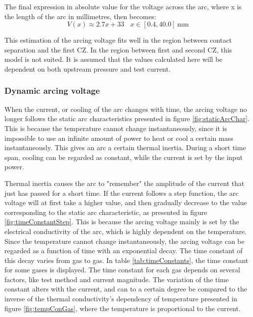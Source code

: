 \documentclass[10pt,b5paper,twoside]{article}
\begin{document}
The final expression in absolute value for the voltage across the arc, where x is the length of the arc in millimetres, then becomes:
\begin{equation}
V(x) \approx 2.7x+33 \ \ \ \ x \in [0.4, 40.0] \ \mathrm{mm}
\end{equation}

This estimation of the arcing voltage fits well in the region between contact separation and the first CZ. In the region between first and second CZ, this model is not suited. It is assumed that the values calculated here will be dependent on both upstream pressure and test current.


\subsubsection{Dynamic arcing voltage} \label{sec:dynARC}
When the current, or cooling of the arc changes with time, the arcing voltage no longer follows the static arc characteristics presented in figure \ref{fig:staticArcChar}. This is because the temperature cannot change instantaneously, since it is impossible to use an infinite amount of power to heat or cool a certain mass instantaneously. This gives an arc a certain thermal inertia. During a short time span, cooling can be regarded as constant, while the current is set by the input power.

Thermal inertia causes the arc to "remember" the amplitude of the current that just has passed for a short time. If the current follows a step function, the arc voltage will at first take a higher value, and then gradually decrease to the value corresponding to the static arc characteristic, as presented in figure \ref{fig:timeConstantStep}. This is because the arcing voltage mainly is set by the electrical conductivity of the arc, which is highly dependent on the temperature. Since the temperature cannot change instantaneously, the arcing voltage can be regarded as a function of time with an exponential decay. The time constant of this decay varies from gas to gas. In table \ref{tab:timeConstants}, the time constant for some gases is displayed. The time constant for each gas depends on several factors, like test method and current magnitude. The variation of the time constant alters with the current, and can to a certain degree be compared to the inverse of the thermal conductivity's dependency of temperature presented in figure \ref{fig:tempConGas}, where the temperature is proportional to the current. 
\end{document}
